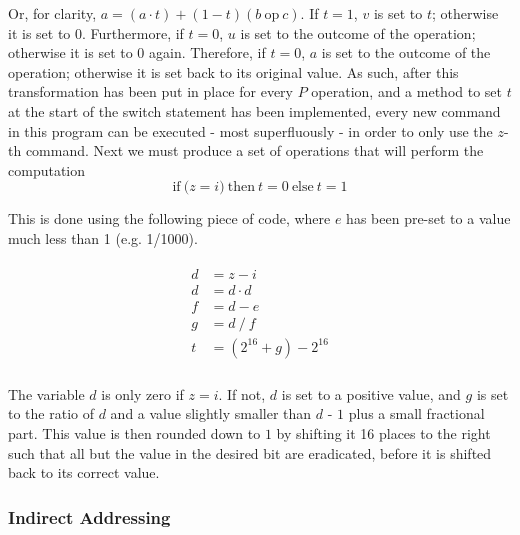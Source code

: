 \documentclass[Master.tex]{subfiles}
\begin{document}
Or, for clarity, $a = (a \cdot t) + (1 - t)(b\ \mathrm{op}\ c)$. If $t = 1$, $v$ is set to $t$; otherwise it is set to $0$. Furthermore, if $t = 0$, $u$ is set to the outcome of the operation; otherwise it is set to $0$ again. Therefore, if $t = 0$, $a$ is set to the outcome of the operation; otherwise it is set back to its original value. As such, after this transformation has been put in place for every $P$ operation, and a method to set $t$ at the start of the switch statement has been implemented, every new command in this program can be executed - most superfluously - in order to only use the $z$-th command. Next we must produce a set of operations that will perform the computation
\begin{equation*}
\mathrm{if\ (}z = i\mathrm{)\ then\ } t = 0 \mathrm{\ else\ } t = 1
\end{equation*}

This is done using the following piece of code, where $e$ has been pre-set to a value much less than 1 (e.g. 1/1000).

\begin{gather*}
\begin{aligned}
d &= z - i \\
d &= d \cdot d \\
f &= d - e \\
g &= d\ /\ f \\[1ex]
t &= (2^{16} + g) - 2^{16} \\
\end{aligned}
\end{gather*}

The variable $d$ is only zero if $z = i$. If not, $d$ is set to a positive value, and $g$ is set to the ratio of $d$ and a value slightly smaller than $d$ - $1$ plus a small fractional part. This value is then rounded down to $1$ by shifting it 16 places to the right such that all but the value in the desired bit are eradicated, before it is shifted back to its correct value.

\subsubsection{Indirect Addressing}
\end{document}
